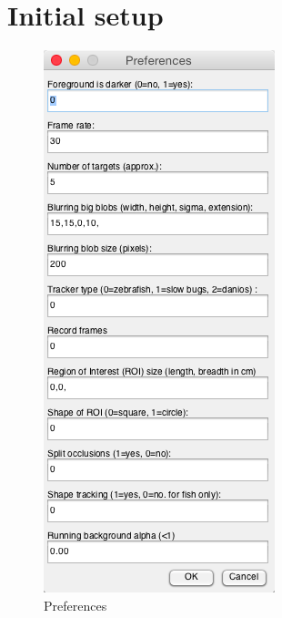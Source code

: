 \documentclass[11pt]{article}
\begin{document}
\section{Initial setup}
\begin{figure}[ht]
\centering
\includegraphics[width=.295\linewidth]{prefs}
\caption{Preferences}
\label{fig:prefs}
\end{figure}
\end{document}
